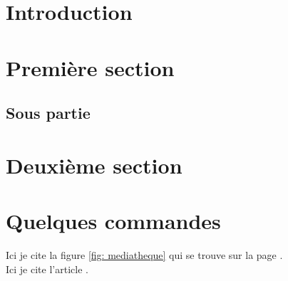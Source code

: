 \documentclass{rapportECM}
\begin{document}
\begin{center}
  \renewcommand{\abstractname}{Abstract}
	\begin{abstract}
    \lipsum[1-2]
  \end{abstract}
\end{center}

\newpage

\pagestyle{introduction} %

\section*{Introduction}
\lipsum[2-3]
\newpage
\pagestyle{document}


\section{Première section}

\lipsum[3-4]

\subsection{Sous partie}

\lipsum[3-4]

\section{Deuxième section}

\lipsum[2-5]

\section{Quelques commandes}


Ici je cite la figure \ref{fig: mediatheque} qui se trouve sur la page \pageref{fig: mediatheque}.\\

Ici je cite l'article \cite{Debauche2021}.
\end{document}

